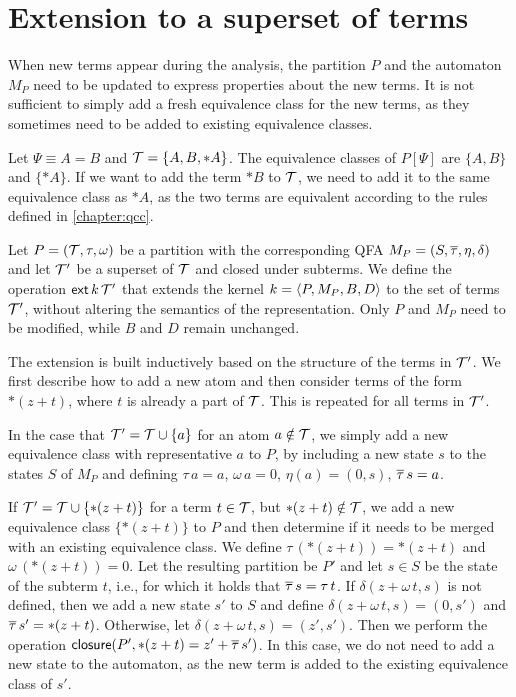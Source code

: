 \section{Extension to a superset of terms}

When new terms appear during the analysis, the partition $P$ and the automaton $M_P$ need to be updated to express properties about the new terms.
It is not sufficient to simply add a fresh equivalence class for the new terms, as they sometimes need to be added to existing equivalence classes.

\begin{example}
    Let $\Psi \equiv A = B$ and $\T = \{A, B, *A\}$.
    The equivalence classes of $P[\Psi]$ are $\{A, B\}$ and $\{*A\}$.
    If we want to add the term $*B$ to $\T$, we need to add it to the same equivalence class as $*A$, as the two terms are equivalent according to the rules defined in \cref{chapter:qcc}.
\end{example}

Let $P = (\T, \tau, \omega)$ be a partition with the corresponding QFA $M_P = (S, \otau, \eta, \delta)$ and let $\T'$ be a superset of $\T$ and closed under subterms.
We define the operation $\ext{k}{\T'}$ that extends the kernel $k = \angl{P, M_P, B, D}$ to the set of terms $\T'$, without altering the semantics of the representation.
Only $P$ and $M_P$ need to be modified, while $B$ and $D$ remain unchanged.

The extension is built inductively based on the structure of the terms in $\T'$.
We first describe how to add a new atom and then consider terms of the form $*(z+t)$, where $t$ is already a part of $\T$.
This is repeated for all terms in $\T'$.

In the case that $\T' = \T \cup \{a\}$ for an atom $a \notin \T$, we simply add a new equivalence class with representative $a$ to $P$, by including a new state $s$ to the states $S$ of $M_P$ and defining $\tau\,a = a$, $\omega\,a=0$, $\eta(a) = (0,s)$, $\otau\,s = a$.

If $\T' = \T \cup \{*(z+t)\}$ for a term $t \in \T$, but $*(z + t) \notin \T$, we add a new equivalence class $\{*(z+t)\}$ to $P$ and then determine if it needs to be merged with an existing equivalence class.
We define $\tau\,(*(z+t)) = *(z+t)$ and $\omega\,(*(z+t))=0$.
Let the resulting partition be $P'$ and let $s \in S$ be the state of the subterm $t$, i.e., for which it holds that $\otau\,s = \tau\,t$.
If $\delta(z + \omega\,t,s)$ is not defined, then we add a new state $s'$ to $S$ and define $\delta(z + \omega\,t, s) = (0, s')$ and $\otau\,s' = *(z+t)$.
Otherwise, let $\delta(z + \omega\,t, s) = (z', s')$.
Then we perform the operation $\closure{*(z + t)}{z'}{\otau\,s'}{P'}$.
In this case, we do not need to add a new state to the automaton,
as the new term is added to the existing equivalence class of $s'$.
